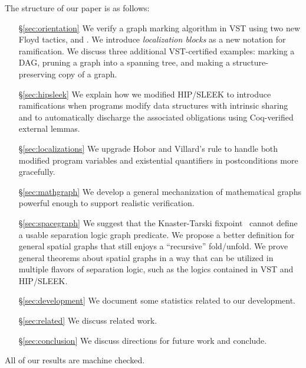 The structure of our paper is as follows:
\begin{itemize}
\item[\S\ref{sec:orientation}] We verify a graph marking algorithm in VST using two new Floyd tactics,  and .  We introduce \emph{localization blocks} as a new notation for ramification.  We discuss three additional VST-certified examples: marking a DAG, pruning a graph into a spanning tree, and making a structure-preserving copy of a graph.
\item[\S\ref{sec:hipsleek}] We explain how we modified HIP/SLEEK to introduce ramifications when programs modify data structures with intrinsic sharing and to automatically discharge the associated obligations using Coq-verified external lemmas.
\item[\S\ref{sec:localizations}] We upgrade Hobor and Villard's  rule to handle both modified program variables and existential quantifiers in postconditions more gracefully.
\item[\S\ref{sec:mathgraph}] We develop a general mechanization of mathematical graphs powerful enough to support realistic verification. %
\item[\S\ref{sec:spacegraph}] We suggest that the Knaster-Tarski fixpoint~\cite{tarski:fixpoint} cannot define a usable separation logic graph predicate.  We propose a better definition for general spatial graphs that still enjoys a ``recursive'' fold/unfold.  We prove general theorems about spatial graphs in a way that can be utilized in multiple flavors of separation logic, such as the logics contained in VST and HIP/SLEEK. %
\item[\S\ref{sec:development}] We document some statistics related to our development.
\item[\S\ref{sec:related}] We discuss related work.
\item[\S\ref{sec:conclusion}] We discuss directions for future work and conclude.
\end{itemize}
All of our results are machine checked.

